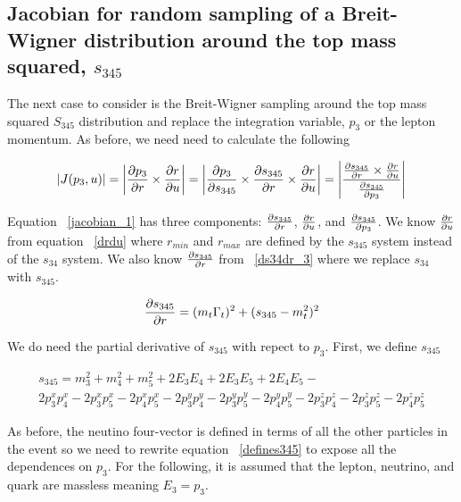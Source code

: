 \subsection{Jacobian for random sampling of a Breit-Wigner distribution around
the top mass squared, $s_{345}$}

The next case to consider is the Breit-Wigner sampling around the top mass squared
$S_{345}$ distribution and replace the integration variable, $p_{3}$ or the
lepton momentum. As before, we need need to calculate the following

\begin{equation}
\label{jacobian_1}
|J(p_{3}, u)| = \left| \frac{\partial p_{3}}{\partial r} \times \frac{\partial r}{\partial u} \right| = \left|
\frac{\partial p_{3}}{\partial s_{345}} \times \frac{\partial s_{345}}{\partial r} \times \frac{\partial r}{\partial u} \right| =
\left | \frac{\frac{\partial s_{345}}{\partial r} \times
\frac{\partial r}{\partial u}}{\frac{\partial s_{345}}{\partial p_{3}}} \right |
\end{equation}

Equation ~\ref{jacobian_1} has three components: $\frac{\partial s_{345}}{\partial r}$,
$\frac{\partial r}{\partial u}$, and $\frac{\partial s_{345}}{\partial p_{3}}$. We know $\frac{\partial r}{\partial u}$ from
equation ~\ref{drdu} where $r_{min}$ and $r_{max}$ are defined by the $s_{345}$
system instead of the $s_{34}$ system. We also know $\frac{\partial s_{345}}{\partial r}$ from ~\ref{ds34dr_3}
where we replace $s_{34}$ with $s_{345}$.

\begin{equation}
\label{ds345dr}
\frac{\partial s_{345}}{\partial r} = (m_{t}\Gamma_{t})^{2} + (s_{345} - m_{t}^{2})^{2}
\end{equation}

We do need the partial derivative of $s_{345}$ with repect to
$p_{3}$. First, we define $s_{345}$

\begin{eqnarray}
\label{defines345}
\nonumber
s_{345} = m_{3}^{2} + m_{4}^{2} + m_{5}^{2} + 2E_{3}E_{4} + 2E_{3}E_{5} +
2E_{4}E_{5} - \\
2p_{3}^{x}p_{4}^{x} - 2p_{3}^{x}p_{5}^{x} - 2p_{4}^{x}p_{5}^{x} -
2p_{3}^{y}p_{4}^{y} - 2p_{3}^{y}p_{5}^{y} - 2p_{4}^{y}p_{5}^{y} -
2p_{3}^{z}p_{4}^{z} - 2p_{3}^{z}p_{5}^{z} - 2p_{4}^{z}p_{5}^{z}
\end{eqnarray}

As before, the neutino four-vector is defined in terms of all the other particles in
the event so we need to rewrite equation ~\ref{defines345} to expose all the
dependences on $p_{3}$. For the following, it is assumed that the lepton,
neutrino, and quark are massless meaning $E_{3} = p_{3}$.

